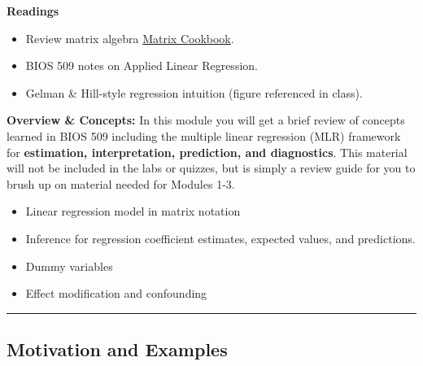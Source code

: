 \documentclass[
  letterpaper,
  DIV=11,
  numbers=noendperiod]{scrreprt}
\providecommand{\tightlist}{%
  \setlength{\itemsep}{0pt}\setlength{\parskip}{0pt}}\usepackage{longtable,booktabs,array}
\begin{document}
\textbf{Readings}

\begin{itemize}
\tightlist
\item
  Review matrix algebra
  \href{https://www.math.uwaterloo.ca/~hwolkowi/matrixcookbook.pdf}{Matrix
  Cookbook}.
\item
  BIOS 509 notes on Applied Linear Regression.\\
\item
  Gelman \& Hill-style regression intuition (figure referenced in
  class).
\end{itemize}

\textbf{Overview \& Concepts:} In this module you will get a brief
review of concepts learned in BIOS 509 including the multiple linear
regression (MLR) framework for \textbf{estimation, interpretation,
prediction, and diagnostics}. This material will not be included in the
labs or quizzes, but is simply a review guide for you to brush up on
material needed for Modules 1-3.

\begin{itemize}
\item
  Linear regression model in matrix notation
\item
  Inference for regression coefficient estimates, expected values, and
  predictions.
\item
  Dummy variables
\item
  Effect modification and confounding
\end{itemize}

\begin{center}\rule{0.5\linewidth}{0.5pt}\end{center}

\hypertarget{motivation-and-examples}{%
\subsection*{Motivation and Examples}\label{motivation-and-examples}}
\end{document}
